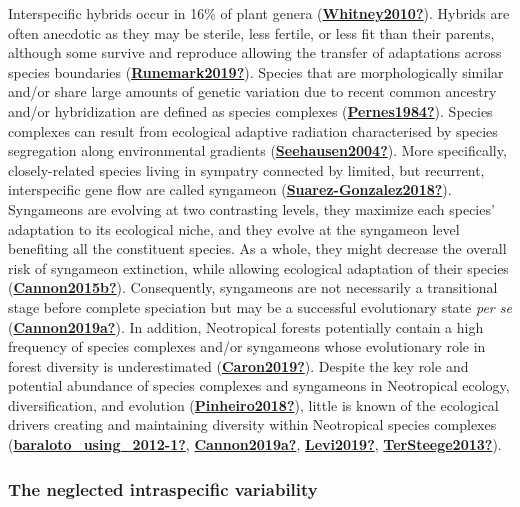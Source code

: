 \documentclass[12pt,twoside,a4paper, a]{article}
\begin{document}
Interspecific hybrids occur in 16\% of plant genera (\protect\hyperlink{ref-Whitney2010}{\textbf{Whitney2010?}}).
Hybrids are often anecdotic as they may be sterile, less fertile, or less fit than their parents,
although some survive and reproduce allowing the transfer of adaptations across species boundaries (\protect\hyperlink{ref-Runemark2019}{\textbf{Runemark2019?}}).
Species that are morphologically similar and/or share large amounts of genetic variation due to recent common ancestry and/or hybridization are defined as species complexes (\protect\hyperlink{ref-Pernes1984}{\textbf{Pernes1984?}}).
Species complexes can result from ecological adaptive radiation characterised by species segregation along environmental gradients (\protect\hyperlink{ref-Seehausen2004}{\textbf{Seehausen2004?}}).
More specifically, closely-related species living in sympatry connected by limited, but recurrent, interspecific gene flow are called syngameon (\protect\hyperlink{ref-Suarez-Gonzalez2018}{\textbf{Suarez-Gonzalez2018?}}).
Syngameons are evolving at two contrasting levels, they maximize each species' adaptation to its ecological niche, and they evolve at the syngameon level benefiting all the constituent species.
As a whole, they might decrease the overall risk of syngameon extinction, while allowing ecological adaptation of their species (\protect\hyperlink{ref-Cannon2015b}{\textbf{Cannon2015b?}}).
Consequently, syngameons are not necessarily a transitional stage before complete speciation but may be a successful evolutionary state \emph{per se} (\protect\hyperlink{ref-Cannon2019a}{\textbf{Cannon2019a?}}).
In addition, Neotropical forests potentially contain a high frequency of species complexes and/or syngameons
whose evolutionary role in forest diversity is underestimated (\protect\hyperlink{ref-Caron2019}{\textbf{Caron2019?}}).
Despite the key role and potential abundance of species complexes and syngameons in Neotropical ecology, diversification, and evolution (\protect\hyperlink{ref-Pinheiro2018}{\textbf{Pinheiro2018?}}), little is known of the ecological drivers creating and maintaining diversity within Neotropical species complexes (\protect\hyperlink{ref-baraloto_using_2012-1}{\textbf{baraloto\_using\_2012-1?}}, \protect\hyperlink{ref-Cannon2019a}{\textbf{Cannon2019a?}}, \protect\hyperlink{ref-Levi2019}{\textbf{Levi2019?}}, \protect\hyperlink{ref-TerSteege2013}{\textbf{TerSteege2013?}}).

\hypertarget{the-neglected-intraspecific-variability}{%
\subsubsection{The neglected intraspecific variability}\label{the-neglected-intraspecific-variability}}
\end{document}
